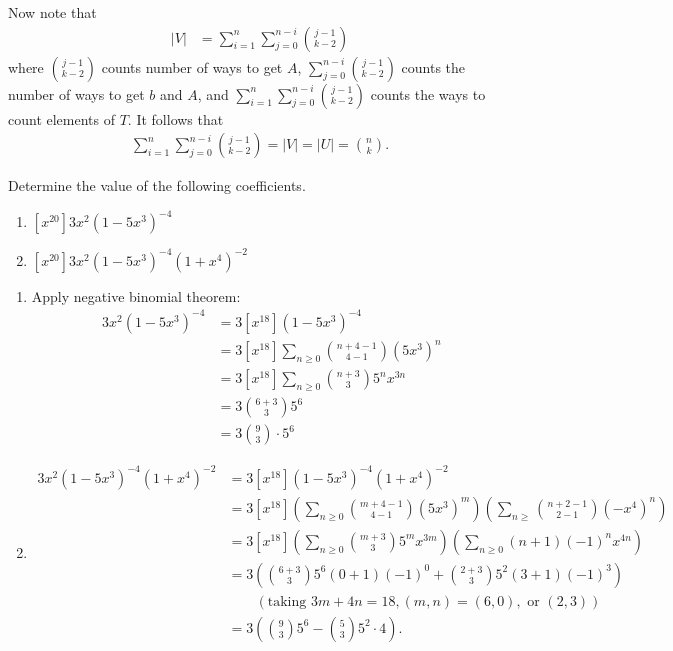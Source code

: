\begin{enumerate}
    Now note that
    \begin{align*}
        |V| &= \sum_{i=1}^n \sum_{j=0}^{n-i} \binom{j-1}{k-2}
    \end{align*}
    where $ \binom{j-1}{k-2}$ counts number of ways to get $A$, $\sum_{j=0}^{n-i} \binom{j-1}{k-2}$ counts the number of ways to get $b$ and $A$, and $\sum_{i=1}^n \sum_{j=0}^{n-i} \binom{j-1}{k-2}$ counts the ways to count elements of $T$. It follows that
    \begin{align*}
        \sum_{i=1}^n \sum_{j=0}^{n-i} \binom{j-1}{k-2} = |V| = |U| = \binom{n}{k}.
    \end{align*}
    
     Determine the value of the following coefficients. 
    \begin{enumerate}
        \item $[x^{20}]3x^2(1-5x^3)^{-4}$
        \item $[x^{20}]3x^2(1-5x^3)^{-4}(1+x^4)^{-2}$
    \end{enumerate}
    \answer \begin{enumerate}
        \item Apply negative binomial theorem:
        \begin{align*}
            [x^{20}]3x^2(1-5x^3)^{-4} &= 3[x^{18}](1-5x^3)^{-4} \\
            &= 3[x^{18}]\sum_{n\geq 0}\binom{n+4-1}{4-1}(5x^3)^n \\
            &= 3[x^{18}]\sum_{n\geq 0}\binom{n+3}{3}5^nx^{3n} \\
            &= 3 \binom{6+3}{3}5^6\\
            &= 3 \binom{9}{3} \cdot 5^6
        \end{align*}
        \item 
        \begin{align*}
            [x^{20}]3x^2(1-5x^3)^{-4}(1+x^4)^{-2} &= 3[x^{18}](1-5x^3)^{-4}(1+x^4)^{-2} \\
            &=3[x^{18}]\left(\sum_{n\geq 0}\binom{m+4-1}{4-1}(5x^3)^m\right)\left(\sum_{n\geq} \binom{n+2-1}{2-1}(-x^4)^n\right)\\
            &= 3[x^{18}]\left(\sum_{n \geq 0}\binom{m+3}{3}5^mx^{3m}\right)\left(\sum_{n\geq0}(n+1)(-1)^nx^{4n}\right)\\
            &= 3\left(\binom{6+3}{3}5^6(0+1)(-1)^0 + \binom{2+3}{3}5^2(3+1)(-1)^3\right)
            \\
            & \qquad (\text{taking } 3m+4n=18, (m,n) = (6,0), \text{ or } (2,3))
            \\&=3\left(\binom{9}{3}5^6 - \binom{5}{3}5^2\cdot4 \right).
        \end{align*}
    \end{enumerate}
    

\end{enumerate}
